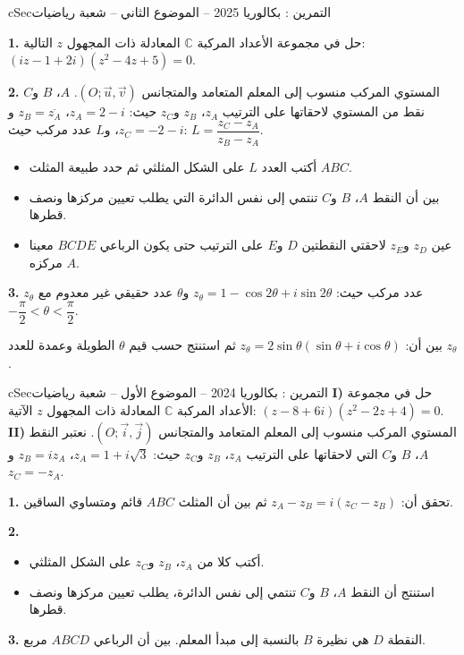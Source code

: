 \documentclass[12pt,a4paper]{article}
\newenvironment{BOX}[2]{\begin{otherlanguage}{english}\begin{arbox}{#1}{#2}}{\end{arbox}\end{otherlanguage}}
\newcounter{exo}
\newenvironment{tamrin}[1]{\stepcounter{exo}\begin{BOX}{cSec}{التمرين \theexo: #1}}{\end{BOX}}
\newenvironment{sq}{\begin{itemize}[leftmargin=2.4em,itemsep=3pt]}{\end{itemize}}
\newcommand{\qa}{\item[(أ)]}\newcommand{\qb}{\item[(ب)]}\newcommand{\qc}{\item[(جـ)]}\newcommand{\qd}{\item[(د)]}\newcommand{\qe}{\item[(هـ)]}
\newcommand{\QQ}[1]{\par\smallskip\textbf{#1.} }
\begin{document}
\begin{tamrin}{بكالوريا 2025 -- الموضوع الثاني -- شعبة رياضيات}
\QQ{1} حل في مجموعة الأعداد المركبة $\mathbb{C}$ المعادلة ذات المجهول $z$ التالية: $\left(iz-1+2i\right)\left(z^2-4z+5\right)=0$.

\QQ{2} المستوي المركب منسوب إلى المعلم المتعامد والمتجانس $\left(O;\vec u,\vec v\right)$.
$A$، $B$ و$C$ نقط من المستوي لاحقاتها على الترتيب $z_A$، $z_B$ و$z_C$ حيث: $z_A=2-i$، $z_B=\overline{z_A}$ و$z_C=-2-i$،
و$L$ عدد مركب حيث: $L=\dfrac{z_C-z_A}{z_B-z_A}$.
\begin{sq}
\qa أكتب العدد $L$ على الشكل المثلثي ثم حدد طبيعة المثلث $ABC$.
\qb بين أن النقط $A$، $B$ و$C$ تنتمي إلى نفس الدائرة التي يطلب تعيين مركزها ونصف قطرها.
\qc عين $z_D$ و$z_E$ لاحقتي النقطتين $D$ و$E$ على الترتيب حتى يكون الرباعي $BCDE$ معينا مركزه $A$.
\end{sq}
\QQ{3} $z_\theta$ عدد مركب حيث: $z_\theta=1-\cos2\theta+i\sin2\theta$ و$\theta$ عدد حقيقي غير معدوم مع $-\dfrac{\pi}{2}<\theta<\dfrac{\pi}{2}$.

بين أن: $z_\theta=2\sin\theta\left(\sin\theta+i\cos\theta\right)$ ثم استنتج حسب قيم $\theta$ الطويلة وعمدة للعدد $z_\theta$.
\end{tamrin}

\begin{tamrin}{بكالوريا 2024 -- الموضوع الأول -- شعبة رياضيات}
\textbf{I)} حل في مجموعة الأعداد المركبة $\mathbb{C}$ المعادلة ذات المجهول $z$ الآتية: $\left(z-8+6i\right)\left(z^2-2z+4\right)=0$.
\textbf{II)} المستوي المركب منسوب إلى المعلم المتعامد والمتجانس $\left(O;\vec i,\vec j\right)$.
نعتبر النقط $A$، $B$ و$C$ التي لاحقاتها على الترتيب $z_A$، $z_B$ و$z_C$ حيث: $z_A=1+i\sqrt3$، $z_B=iz_A$ و$z_C=-z_A$.

\QQ{1} تحقق أن: $z_A-z_B=i\left(z_C-z_B\right)$ ثم بين أن المثلث $ABC$ قائم ومتساوي الساقين.

\QQ{2}
\begin{sq}
\qa أكتب كلا من $z_A$، $z_B$ و$z_C$ على الشكل المثلثي.
\qb استنتج أن النقط $A$، $B$ و$C$ تنتمي إلى نفس الدائرة، يطلب تعيين مركزها ونصف قطرها.
\end{sq}
\QQ{3} النقطة $D$ هي نظيرة $B$ بالنسبة إلى مبدأ المعلم. بين أن الرباعي $ABCD$ مربع.
\end{tamrin}
\end{document}
